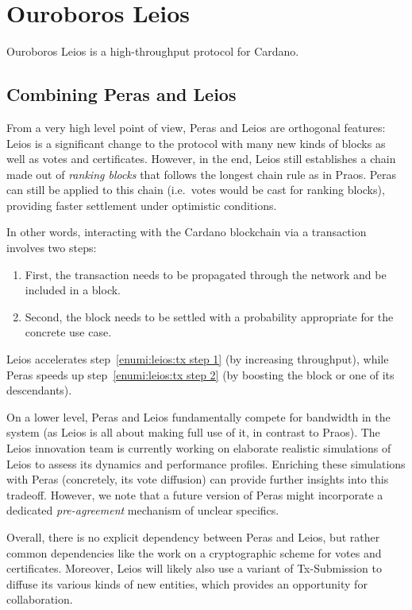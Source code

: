 \section{Ouroboros Leios}\label{sec:leios}

Ouroboros Leios is a high-throughput protocol for Cardano.

\subsection{Combining Peras and Leios}

From a very high level point of view, Peras and Leios are orthogonal features:
Leios is a significant change to the protocol with many new kinds of blocks as well as votes and certificates.
However, in the end, Leios still establishes a chain made out of \emph{ranking blocks} that follows the longest chain rule as in Praos.
Peras can still be applied to this chain (i.e.\ votes would be cast for ranking blocks), providing faster settlement under optimistic conditions.

In other words, interacting with the Cardano blockchain via a transaction involves two steps:
\begin{enumerate}
\item\label{enumi:leios:tx step 1}
  First, the transaction needs to be propagated through the network and be included in a block.
\item\label{enumi:leios:tx step 2}
  Second, the block needs to be settled with a probability appropriate for the concrete use case.
\end{enumerate}
Leios accelerates step~\ref{enumi:leios:tx step 1} (by increasing throughput), while Peras speeds up step~\ref{enumi:leios:tx step 2} (by boosting the block or one of its descendants).

On a lower level, Peras and Leios fundamentally compete for bandwidth in the system (as Leios is all about making full use of it, in contrast to Praos).
The Leios innovation team is currently working on elaborate realistic simulations of Leios to assess its dynamics and performance profiles.
Enriching these simulations with Peras (concretely, its vote diffusion) can provide further insights into this tradeoff.
However, we note that a future version of Peras might incorporate a dedicated \emph{pre-agreement} mechanism of unclear specifics.

Overall, there is no explicit dependency between Peras and Leios, but rather common dependencies like the work on a cryptographic scheme for votes and certificates.
Moreover, Leios will likely also use a variant of Tx-Submission to diffuse its various kinds of new entities, which provides an opportunity for collaboration.


